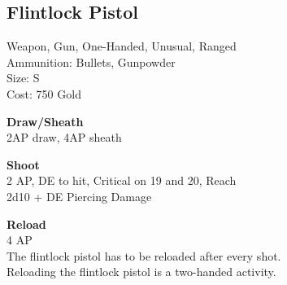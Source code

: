 \subsection{Flintlock Pistol}\label{weapon:flintlockPistol}
Weapon, Gun, One-Handed, Unusual, Ranged\\
Ammunition: Bullets, Gunpowder\\
Size: S\\
Cost: 750 Gold

\textbf{Draw/Sheath} \\
2AP draw, 4AP sheath

\textbf{Shoot} \\
2 AP, DE to hit, Critical on 19 and 20,  Reach\\
2d10 + DE Piercing Damage

\textbf{Reload} \\
4 AP\\
The flintlock pistol has to be reloaded after every shot.\\
Reloading the flintlock pistol is a two-handed activity.
